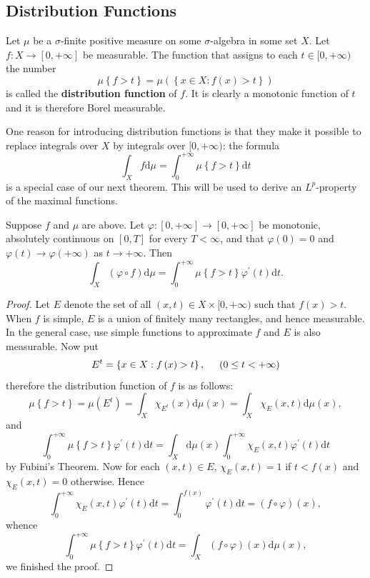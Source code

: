 \subsection{Distribution Functions}
Let $\mu$ be a $\sigma$-finite positive measure on some $\sigma$-algebra in some set $X$. Let $f:X\to [0,+\infty]$ be measurable. The function that assigns to each $t\in [0,+\infty)$ the number 
$$
\mu \left\{ f>t \right\} =\mu \left( \left\{ x\in X:f\left( x \right) >t \right\} \right) 
$$
is called the \textbf{distribution function} of $f$. It is clearly a monotonic function of $t$ and it is therefore Borel measurable.\par
One reason for introducing distribution functions is that they make it possible to replace integrals over $X$ by integrals over $[0,+\infty)$: the formula 
$$
\int_X{f\mathrm{d}\mu}=\int_0^{+\infty}{\mu \left\{ f>t \right\} \mathrm{d}t}
$$
is a special case of our next theorem. This will be used to derive an $L^p$-property of the maximal functions.
\begin{theorem}
Suppose $f$ and $\mu$ are above. Let $\varphi:[0,+\infty]\to[0,+\infty]$ be monotonic, absolutely continuous on $[0,T]$ for every $T<\infty$, and that $\varphi(0)=0$ and $\varphi(t)\to\varphi(+\infty)$ as $t\to+\infty$. Then 
$$
\int_X{\left( \varphi \circ f \right) \mathrm{d}\mu}=\int_0^{+\infty}{\mu \left\{ f>t \right\} \varphi ^{\prime}\left( t \right) \mathrm{d}t}.
$$
\end{theorem}
\begin{proof}
Let $E$ denote the set of all $(x,t)\in X\times[0,+\infty)$ such that $f(x)>t$. When $f$ is simple, $E$ is a union of finitely many rectangles, and hence measurable. In the general case, use simple functions to approximate $f$ and $E$ is also measurable. Now put 
$$
E^t=\left\{ x\in X:f\left( x \right) >t \right\} ,\hspace{0.5cm}\left( 0\le t<+\infty \right) 
$$
therefore the distribution function of $f$ is as follows: 
$$
\mu \left\{ f>t \right\} =\mu \left( E^t \right) =\int_X{\chi _{E^t}\left( x \right) \mathrm{d}\mu \left( x \right)}=\int_X{\chi _E\left( x,t \right) \mathrm{d}\mu \left( x \right)},
$$
and 
$$
\int_0^{+\infty}{\mu \left\{ f>t \right\} \varphi ^{\prime}\left( t \right) \mathrm{d}t}=\int_X{\mathrm{d}\mu \left( x \right) \int_0^{+\infty}{\chi _E\left( x,t \right) \varphi ^{\prime}\left( t \right) \mathrm{d}t}}
$$
by Fubini's Theorem. Now for each $(x,t)\in E$, $\chi_E(x,t)=1$ if $t<f(x)$ and $\chi_E(x,t)=0$ otherwise. Hence 
$$
\int_0^{+\infty}{\chi _E\left( x,t \right) \varphi ^{\prime}\left( t \right) \mathrm{d}t}=\int_0^{f\left( x \right)}{\varphi ^{\prime}\left( t \right) \mathrm{d}t}=\left( f\circ \varphi \right) \left( x \right) ,
$$
whence 
$$
\int_0^{+\infty}{\mu \left\{ f>t \right\} \varphi ^{\prime}\left( t \right) \mathrm{d}t}=\int_X{\left( f\circ \varphi \right) \left( x \right) \mathrm{d}\mu \left( x \right)},
$$
we finished the proof.
\end{proof}
